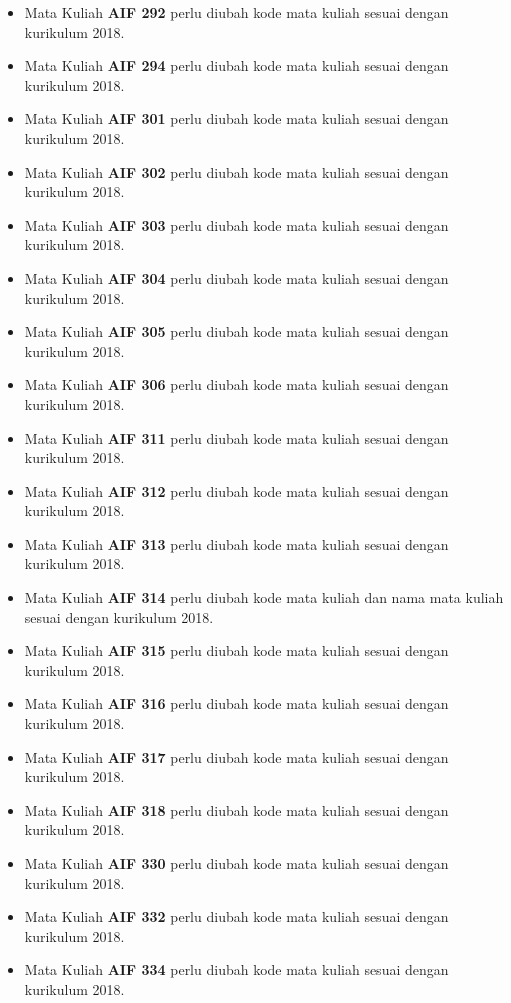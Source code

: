 \begin{enumerate}
\begin{itemize}
		\item Mata Kuliah \textbf{AIF 292} perlu diubah kode mata kuliah sesuai dengan kurikulum 2018.
		\item Mata Kuliah \textbf{AIF 294} perlu diubah kode mata kuliah sesuai dengan kurikulum 2018.
		\item Mata Kuliah \textbf{AIF 301} perlu diubah kode mata kuliah sesuai dengan kurikulum 2018.
		\item Mata Kuliah \textbf{AIF 302} perlu diubah kode mata kuliah sesuai dengan kurikulum 2018.
		\item Mata Kuliah \textbf{AIF 303} perlu diubah kode mata kuliah sesuai dengan kurikulum 2018.
		\item Mata Kuliah \textbf{AIF 304} perlu diubah kode mata kuliah sesuai dengan kurikulum 2018.
		\item Mata Kuliah \textbf{AIF 305} perlu diubah kode mata kuliah sesuai dengan kurikulum 2018.
		\item Mata Kuliah \textbf{AIF 306} perlu diubah kode mata kuliah sesuai dengan kurikulum 2018.
		\item Mata Kuliah \textbf{AIF 311} perlu diubah kode mata kuliah sesuai dengan kurikulum 2018.
		\item Mata Kuliah \textbf{AIF 312} perlu diubah kode mata kuliah sesuai dengan kurikulum 2018.
		\item Mata Kuliah \textbf{AIF 313} perlu diubah kode mata kuliah sesuai dengan kurikulum 2018.
		\item Mata Kuliah \textbf{AIF 314} perlu diubah kode mata kuliah dan nama mata kuliah sesuai dengan kurikulum 2018.
		\item Mata Kuliah \textbf{AIF 315} perlu diubah kode mata kuliah sesuai dengan kurikulum 2018.
		\item Mata Kuliah \textbf{AIF 316} perlu diubah kode mata kuliah sesuai dengan kurikulum 2018.
		\item Mata Kuliah \textbf{AIF 317} perlu diubah kode mata kuliah sesuai dengan kurikulum 2018.
		\item Mata Kuliah \textbf{AIF 318} perlu diubah kode mata kuliah sesuai dengan kurikulum 2018.
		\item Mata Kuliah \textbf{AIF 330} perlu diubah kode mata kuliah sesuai dengan kurikulum 2018.
		\item Mata Kuliah \textbf{AIF 332} perlu diubah kode mata kuliah sesuai dengan kurikulum 2018.
		\item Mata Kuliah \textbf{AIF 334} perlu diubah kode mata kuliah sesuai dengan kurikulum 2018.

\end{itemize}
\end{enumerate}
